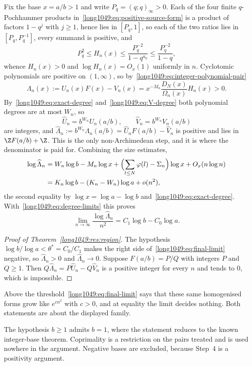 \documentclass[11pt]{article}
\begin{document}
Fix the base $x=a/b>1$ and write $P_q=(q;q)_\infty>0$.  Each of the four finite
$q$-Pochhammer products in~\eqref{long1049:eq:positive-source-form} is a product of
factors $1-q^{j}$ with $j\ge1$, hence lies in $[P_q,1]$, so each of the two
ratios lies in $[P_q,P_q^{-1}]$, every summand is positive, and
\[
 P_q^{2}\le H_n(x)\le\frac{P_q^{-2}}{1-q^{a_0}}\le\frac{P_q^{-2}}{1-q},
\]
whence $H_n(x)>0$ and $\log H_n(x)=O_x(1)$ uniformly in $n$.  Cyclotomic
polynomials are positive on $(1,\infty)$, so
by~\eqref{long1049:eq:integer-polynomial-pair}
\[
 \Lambda_n(x):=U_n(x)F(x)-V_n(x)=x^{-M_n}\frac{D_N(x)}{\Omega_n(x)}H_n(x)>0 .
\]
By~\eqref{long1049:eq:exact-degree} and~\eqref{long1049:eq:V-degree} both polynomial degrees are
at most $W_n$, so
\[
 \widehat U_n=b^{W_n}U_n(a/b),\qquad \widehat V_n=b^{W_n}V_n(a/b)
\]
are integers, and $\widehat\Lambda_n:=b^{W_n}\Lambda_n(a/b)
=\widehat U_nF(a/b)-\widehat V_n$ is positive and lies in $\Z F(a/b)+\Z$.  This
is the only non-Archimedean step, and it is where the denominator is paid for.
Combining the size estimates,
\[
 \begin{aligned}
 \log\widehat\Lambda_n
 &=W_n\log b-M_n\log x+\Bigl(\sum_{l\le N}\varphi(l)-\Sigma_n\Bigr)\log x+O_x(n\log n)\\
 &=K_n\log b-(K_n-W_n)\log a+o(n^{2}),
\end{aligned}
\]
the second equality by $\log x=\log a-\log b$ and~\eqref{long1049:eq:exact-degree}.
With~\eqref{long1049:eq:degree-limits} this proves
\begin{equation}\label{long1049:eq:final-limit}
 \lim_{n\to\infty}\frac{\log\widehat\Lambda_n}{n^{2}}=C_1\log b-C_0\log a .
\end{equation}

\begin{proof}[Proof of Theorem~\ref{long1049:res:region}]
The hypothesis $\log b/\log a<\theta^{*}=C_0/C_1$ makes the right side
of~\eqref{long1049:eq:final-limit} negative, so $\widehat\Lambda_n>0$ and
$\widehat\Lambda_n\to0$.  Suppose $F(a/b)=P/Q$ with integers $P$ and $Q\ge1$.
Then $Q\widehat\Lambda_n=P\widehat U_n-Q\widehat V_n$ is a positive integer for
every $n$ and tends to $0$, which is impossible.
\end{proof}

\noindent Above the threshold~\eqref{long1049:eq:final-limit} says that these same
homogenised forms grow like $e^{cn^{2}}$ with $c>0$, and at equality the limit
decides nothing.  Both statements are about the displayed family.

\noindent The hypothesis $b\ge1$ admits $b=1$, where the statement reduces to
the known integer-base theorem.  Coprimality is a restriction on the pairs
treated and is used nowhere in the argument.  Negative bases are excluded,
because Step~4 is a positivity argument.
\end{document}
